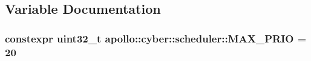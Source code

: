 \subsection{Variable Documentation}
\hypertarget{namespaceapollo_1_1cyber_1_1scheduler_a9bc4ff591ee6d0710ed99d197b4ce9d2}{
\subsubsection[{M\-A\-X\-\_\-\-P\-R\-I\-O}]{\setlength{\rightskip}{0pt plus 5cm}constexpr uint32\-\_\-t apollo\-::cyber\-::scheduler\-::\-M\-A\-X\-\_\-\-P\-R\-I\-O = 20\hspace{0.3cm}{\ttfamily [static]}}}\label{namespaceapollo_1_1cyber_1_1scheduler_a9bc4ff591ee6d0710ed99d197b4ce9d2}
